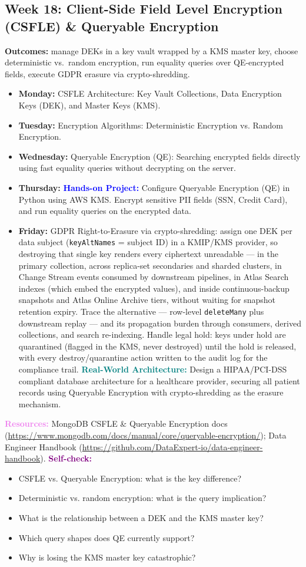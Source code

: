 \documentclass[11pt, a4paper]{article}
\newcommand{\project}[1]{\textbf{\textcolor{blue}{Hands-on Project:}} #1}
\newcommand{\usecase}[1]{\textbf{\textcolor{teal}{Real-World Architecture:}} #1}
\newcommand{\dayitem}[2]{\item \textbf{#1:} #2}
\newcommand{\selfcheck}[1]{\vspace{1mm}\noindent\textbf{\textcolor{purple}{Self-check:}} #1}
\newcommand{\resources}[1]{\vspace{1mm}\noindent\textbf{\textcolor{violet}{Resources:}} #1}
\begin{document}
\subsection*{Week 18: Client-Side Field Level Encryption (CSFLE) \& Queryable Encryption}
\par\noindent\textbf{Outcomes:} manage DEKs in a key vault wrapped by a KMS master key, choose deterministic vs.\ random encryption, run equality queries over QE-encrypted fields, execute GDPR erasure via crypto-shredding.
\begin{itemize}[label=-]
    \dayitem{Monday}{CSFLE Architecture: Key Vault Collections, Data Encryption Keys (DEK), and Master Keys (KMS).}
    \dayitem{Tuesday}{Encryption Algorithms: Deterministic Encryption vs. Random Encryption.}
    \dayitem{Wednesday}{Queryable Encryption (QE): Searching encrypted fields directly using fast equality queries without decrypting on the server.}
    \dayitem{Thursday}{\project{Configure Queryable Encryption (QE) in Python using AWS KMS. Encrypt sensitive PII fields (SSN, Credit Card), and run equality queries on the encrypted data.}}
    \dayitem{Friday}{GDPR Right-to-Erasure via crypto-shredding: assign one DEK per data subject (\texttt{keyAltNames} = subject ID) in a KMIP/KMS provider, so destroying that single key renders every ciphertext unreadable --- in the primary collection, across replica-set secondaries and sharded clusters, in Change Stream events consumed by downstream pipelines, in Atlas Search indexes (which embed the encrypted values), and inside continuous-backup snapshots and Atlas Online Archive tiers, without waiting for snapshot retention expiry. Trace the alternative --- row-level \texttt{deleteMany} plus downstream replay --- and its propagation burden through consumers, derived collections, and search re-indexing. Handle legal hold: keys under hold are quarantined (flagged in the KMS, never destroyed) until the hold is released, with every destroy/quarantine action written to the audit log for the compliance trail. \usecase{Design a HIPAA/PCI-DSS compliant database architecture for a healthcare provider, securing all patient records using Queryable Encryption with crypto-shredding as the erasure mechanism.}}
\end{itemize}
\resources{MongoDB CSFLE \& Queryable Encryption docs (\url{https://www.mongodb.com/docs/manual/core/queryable-encryption/}); Data Engineer Handbook (\url{https://github.com/DataExpert-io/data-engineer-handbook}).}
\selfcheck{\begin{itemize}[label=-, itemsep=0pt, leftmargin=1.5em]
    \item CSFLE vs. Queryable Encryption: what is the key difference?
    \item Deterministic vs. random encryption: what is the query implication?
    \item What is the relationship between a DEK and the KMS master key?
    \item Which query shapes does QE currently support?
    \item Why is losing the KMS master key catastrophic?
\end{itemize}}
\end{document}
